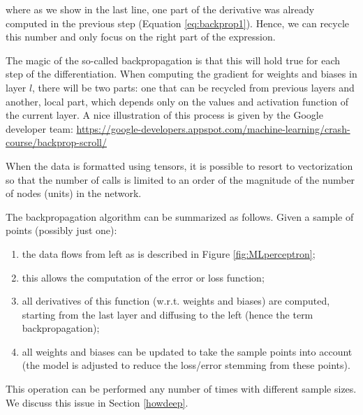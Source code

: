 \documentclass[]{krantz}
\providecommand{\tightlist}{%
  \setlength{\itemsep}{0pt}\setlength{\parskip}{0pt}}
\theoremstyle{definition}
\theoremstyle{definition}
\theoremstyle{definition}
\theoremstyle{remark}
\begin{document}
where as we show in the last line, one part of the derivative was
already computed in the previous step (Equation \eqref{eq:backprop1}).
Hence, we can recycle this number and only focus on the right part of
the expression.

The magic of the so-called backpropagation is that this will hold true
for each step of the differentiation. When computing the gradient for
weights and biases in layer \(l\), there will be two parts: one that can
be recycled from previous layers and another, local part, which depends
only on the values and activation function of the current layer. A nice
illustration of this process is given by the Google developer team:
\url{https://google-developers.appspot.com/machine-learning/crash-course/backprop-scroll/}

When the data is formatted using tensors, it is possible to resort to
vectorization so that the number of calls is limited to an order of the
magnitude of the number of nodes (units) in the network.

The backpropagation algorithm can be summarized as follows. Given a
sample of points (possibly just one):

\begin{enumerate}
\def\labelenumi{\arabic{enumi}.}
\tightlist
\item
  the data flows from left as is described in Figure
  \ref{fig:MLperceptron};\\
\item
  this allows the computation of the error or loss function;\\
\item
  all derivatives of this function (w.r.t. weights and biases) are
  computed, starting from the last layer and diffusing to the left
  (hence the term backpropagation);\\
\item
  all weights and biases can be updated to take the sample points into
  account (the model is adjusted to reduce the loss/error stemming from
  these points).
\end{enumerate}

This operation can be performed any number of times with different
sample sizes. We discuss this issue in Section \ref{howdeep}.
\end{document}
